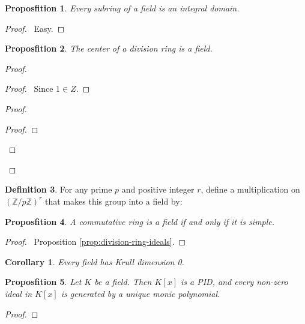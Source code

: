 \documentclass{book}
\let\qed\relax
\newtheorem{prop}{Proposfition}[chapter]
\newtheorem{cor}{Corollary}[prop]
\theoremstyle{definition}
\newtheorem{df}[prop]{Definition}
\newcommand{\inv}[1]{\ensuremath{{#1}^{-1}}}
\begin{document}

\begin{prop}
Every subring of a field is an integral domain.
\end{prop}

\begin{proof}
\pf\ Easy. \qed
\end{proof}

\begin{prop}
The center of a division ring is a field.
\end{prop}

\begin{proof}
\pf
{}
\begin{proof}
\pf\ Since $1 \in Z$.
\end{proof}
\begin{proof}
	\step{b}{$\inv{a} \in Z$}
	\begin{proof}
		\step{iii}{$x \inv{a} = \inv{a} x$}
	\end{proof}
\end{proof}
\qed
\end{proof}

\begin{df}
For any prime $p$ and positive integer $r$, define a multiplication on $(\mathbb{Z} / p \mathbb{Z})^r$ that makes this group into a field by:
\end{df}

\begin{prop}
A commutative ring is a field if and only if it is simple.
\end{prop}

\begin{proof}
\pf\ Proposition \ref{prop:division-ring-ideals}. \qed
\end{proof}

\begin{cor}
Every field has Krull dimension 0.
\end{cor}

\begin{prop}
Let $K$ be a field. Then $K[x]$ is a PID, and every non-zero ideal in $K[x]$ is generated by a unique monic polynomial.
\end{prop}

\begin{proof}
\pf
{}
\qed
\end{proof}
\end{document}
